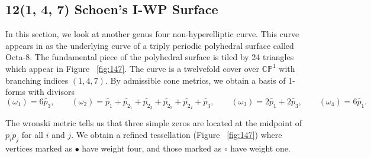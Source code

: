 \documentclass[12pt,reqno]{amsart}
\DeclareMathOperator{\Aut}{Aut}
\newtheorem{lemma}[theorem]{Lemma}
\theoremstyle{definition}
\theoremstyle{remark}
\newtheorem*{remark}{Remark}
\begin{document}









\subsection*{12(1, 4, 7) Schoen's I-WP Surface}


In this section, we look at another genus four non-hyperelliptic curve. This curve appears in \cite{dthesis} as the underlying curve of a triply periodic polyhedral surface called Octa-8. The fundamental piece of the polyhedral surface is tiled by 24 triangles which appear in Figure~ \cref{fig:147}. The curve is a twelvefold cover over $\mathbb{C}\mathbb{P}^1$ with branching indices $(1, 4, 7).$ By admissible cone metrics, we obtain a basis of 1-forms with divisors $$(\omega_1) = 6 \widetilde{p_3}, \qquad (\omega_2) = \widetilde{p_1} + \widetilde{p_{2_1}} + \widetilde{p_{2_2}} + \widetilde{p_{2_3}} + \widetilde{p_{2_4}} + \widetilde{p_3}, \qquad (\omega_3) = 2 \widetilde{p_1} + 2 \widetilde{p_3}, \qquad (\omega_4) = 6 \widetilde{p_1}.$$

The wronski metric tells us that three simple zeros are located at the midpoint of $\overline{p_i p_j}$ for all $i$ and $j.$ We obtain a refined tessellation (Figure~ \cref{fig:147}) where vertices marked as $\bullet$ have weight four, and those marked as $\circ$ have weight one. 
\end{document}

